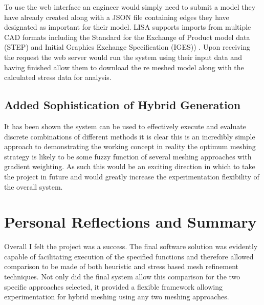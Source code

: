 
\noindent
To use the web interface an engineer would simply need to submit a model they have already created  along with a JSON file containing edges they have designated as important for their model. LISA supports imports from multiple CAD formats including the Standard for the Exchange of Product model data (STEP) and Initial Graphics Exchange Specification (IGES)) \cite{LISAManual}. Upon receiving the request the web server would run the system using their input data and having finished allow them to download the re meshed model along with the calculated stress data for analysis.


\subsection{Added Sophistication of Hybrid Generation}
It has been shown the system can be used to effectively execute and evaluate discrete combinations of different methods it is clear this is an incredibly simple approach to demonstrating the working concept in reality the optimum meshing strategy is likely to be some fuzzy function of several meshing approaches with gradient weighting. As such this would be an exciting direction in which to take the project in future and would greatly increase the experimentation flexibility of the overall system.



\section{Personal Reflections and Summary}

\noindent
Overall I felt the project was a success. The final software solution was evidently capable of facilitating execution of the specified functions and therefore allowed comparison to be made of both heuristic and stress based mesh refinement techniques. Not only did the final system allow this comparison for the two specific approaches selected, it provided a flexible framework allowing experimentation for hybrid meshing using any two meshing approaches. \\ 

